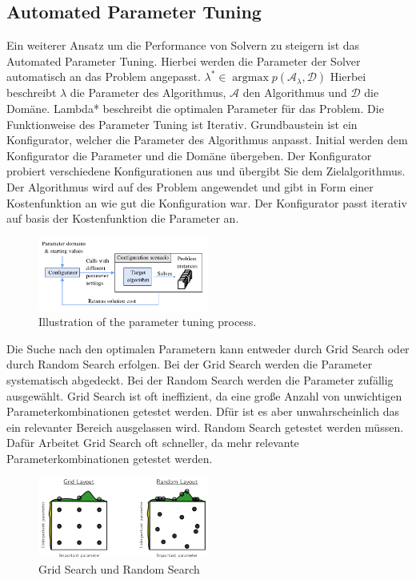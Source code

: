 \subsection{Automated Parameter Tuning }
\label{sec:Automated Parameter Tuning }
Ein weiterer Ansatz um die Performance von Solvern zu steigern ist das Automated
Parameter Tuning. Hierbei werden die Parameter der Solver automatisch an das
Problem angepasst.
$\lambda^{*}\in\mathop{\mathrm{argmax}}p(\mathcal{A}_{\lambda},\mathcal{D})$
Hierbei beschreibt $\lambda$ die Parameter des Algorithmus, $\mathcal{A}$ den
Algorithmus und $\mathcal{D}$ die Domäne. Lambda* beschreibt die optimalen 
Parameter für das Problem.
Die Funktionweise des Parameter Tuning ist Iterativ. Grundbaustein ist ein
Konfigurator, welcher die Parameter des Algorithmus anpasst. Initial werden dem
Konfigurator die Parameter und die Domäne übergeben. Der Konfigurator probiert
verschiedene Konfigurationen aus und übergibt Sie dem Zielalgorithmus. Der
Algorithmus wird auf des Problem angewendet und gibt in Form einer
Kostenfunktion an wie gut die Konfiguration war. Der Konfigurator passt iterativ
auf basis der Kostenfunktion die Parameter an. \cite[31-38]{kotth23pr}
\begin{figure}[h]
    \centering
    \includegraphics[width=0.5\textwidth]{figures/Automated Parameter Tuning [kotth23pr]}
    \caption{Illustration of the parameter tuning process. \cite[34]{kotth23pr}}
    \label{fig:bild}
\end{figure}
Die Suche nach den optimalen Parametern kann entweder durch Grid Search oder
durch Random Search erfolgen. Bei der Grid Search werden die Parameter
systematisch abgedeckt. Bei der Random Search werden die Parameter zufällig
ausgewählt. Grid Search ist oft ineffizient, da eine große Anzahl von
unwichtigen Parameterkombinationen getestet werden. Dfür ist es aber
unwahrscheinlich das ein relevanter Bereich ausgelassen wird. Random Search 
getestet werden müssen. Dafür Arbeitet Grid Search oft schneller, da mehr
relevante Parameterkombinationen getestet werden. \cite[39]{kotth23pr}
\begin{figure}[h]
    \centering
    \includegraphics[width=0.5\textwidth]{figures/Grid Search vs. Random Search [kotth23pr]}
    \caption{Grid Search und Random Search \cite[39]{kotth23pr}}
    \label{fig:bild}
\end{figure}
